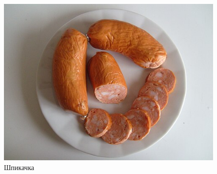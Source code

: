 \begin{figure}[h!]
    \begin{center}
        \includegraphics[scale=0.3]{images/shpikachka.jpg}
    \end{center}
    \caption{Шпикачка}
\end{figure}

